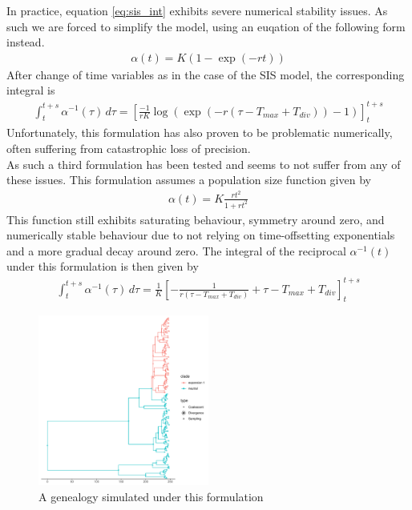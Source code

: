 \documentclass{report}
\theoremstyle{definition}
\begin{document}
In practice, equation \ref{eq:sis_int} exhibits severe numerical stability issues. As such we are forced to simplify the model, using an euqation of the following form instead.
\begin{gather}\label{eq:loggrowth}
\alpha(t) = K(1-\exp(-rt))
\end{gather}
After change of time variables as in the case of the SIS model, the corresponding integral is
\begin{gather}
\int_{t}^{t+s}\alpha^{-1}(\tau)\,d\tau = \left[\frac{-1}{rK}\log(\exp(-r(\tau-T_{max}+T_{div})) - 1)\right]_{t}^{t+s}
\end{gather}
Unfortunately, this formulation has also proven to be problematic numerically, often suffering from catastrophic loss of precision.\\
As such a third formulation has been tested and seems to not suffer from any of these issues. This formulation assumes a population size function given by
\begin{gather}
\alpha(t) = K\frac{rt^2}{1+rt^2}
\end{gather} 
This function still exhibits saturating behaviour, symmetry around zero, and numerically stable behaviour due to not relying on time-offsetting exponentials and a more gradual decay around zero.
The integral of the reciprocal $\alpha^{-1}(t)$ under this formulation is then given by 
\begin{gather}
\int_{t}^{t+s}\alpha^{-1}(\tau)\,d\tau = \frac{1}{K}\left[-\frac{1}{r(\tau-T_{max}+T_{div})}+\tau-T_{max}+T_{div}\right]_{t}^{t+s}
\end{gather} 

\begin{figure}[H]
  \centering
     \includegraphics[width=0.5\textwidth]{../R/test_mcmc/tree_structured}
    \caption{A genealogy simulated under this formulation}
\end{figure}
\end{document}
